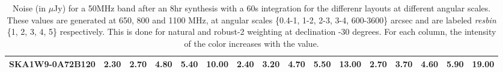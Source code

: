 \begin{table}[!htp]
{{\begin{tabular}{|lccccc||ccccc||ccccc|}
SKA1W9-0A72B120 & 2.30 \cellcolor{blue!33.75} & 2.70 \cellcolor{red!30.60} & 4.80 \cellcolor{green!60.00} & 5.40 \cellcolor{orange!60.00} & 10.00 \cellcolor{purple!60.00} & 2.40 \cellcolor{blue!39.00} & 3.20 \cellcolor{red!44.25} & 4.70 \cellcolor{green!60.00} & 5.50 \cellcolor{orange!60.00} & 13.00 \cellcolor{purple!18.00} & 2.70 \cellcolor{blue!53.00} & 3.70 \cellcolor{red!60.00} & 4.60 \cellcolor{green!60.00} & 5.90 \cellcolor{orange!60.00} & 19.00 \cellcolor{purple!60.00}\\ \hline 
\end{tabular}}
\hspace{1cm} 

\vspace{.0cm}
\caption{Noise (in $\mu$Jy) for a 50MHz band after an 8hr synthesis with a 60s integration for the differenr layouts at different angular scales. These values are generated at 650, 800 and 1100 MHz, at angular scales \{0.4-1, 1-2, 2-3, 3-4, 600-3600\} arcsec and are labeled {\it resbin} \{1, 2, 3, 4, 5\} respectively. This is done for natural and robust-2 weighting at declination -30 degrees. For each column, the intensity of the color increases with the value.}\label{tab:noise50}}
 \end{table}
